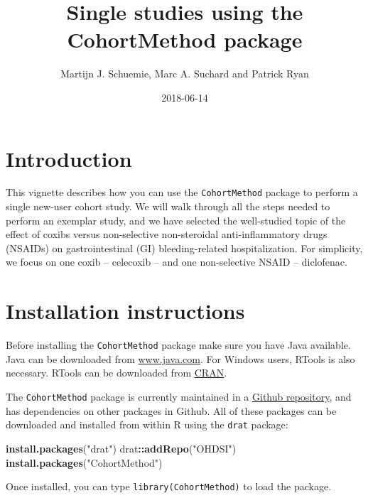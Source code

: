 \documentclass[]{article}
\title{Single studies using the CohortMethod package}
\author{Martijn J. Schuemie, Marc A. Suchard and Patrick Ryan}
\date{2018-06-14}
\newenvironment{Shaded}{\begin{snugshade}}{\end{snugshade}}
\newcommand{\KeywordTok}[1]{\textcolor[rgb]{0.13,0.29,0.53}{\textbf{#1}}}
\newcommand{\NormalTok}[1]{#1}
\newcommand{\OperatorTok}[1]{\textcolor[rgb]{0.81,0.36,0.00}{\textbf{#1}}}
\newcommand{\StringTok}[1]{\textcolor[rgb]{0.31,0.60,0.02}{#1}}
\begin{document}
\maketitle

{
\setcounter{tocdepth}{2}
\tableofcontents
}
\hypertarget{introduction}{%
\section{Introduction}\label{introduction}}

This vignette describes how you can use the \texttt{CohortMethod}
package to perform a single new-user cohort study. We will walk through
all the steps needed to perform an exemplar study, and we have selected
the well-studied topic of the effect of coxibs versus non-selective
non-steroidal anti-inflammatory drugs (NSAIDs) on gastrointestinal (GI)
bleeding-related hospitalization. For simplicity, we focus on one coxib
-- celecoxib -- and one non-selective NSAID -- diclofenac.

\hypertarget{installation-instructions}{%
\section{Installation instructions}\label{installation-instructions}}

Before installing the \texttt{CohortMethod} package make sure you have
Java available. Java can be downloaded from
\href{http://www.java.com}{www.java.com}. For Windows users, RTools is
also necessary. RTools can be downloaded from
\href{http://cran.r-project.org/bin/windows/Rtools/}{CRAN}.

The \texttt{CohortMethod} package is currently maintained in a
\href{https://github.com/OHDSI/CohortMethod}{Github repository}, and has
dependencies on other packages in Github. All of these packages can be
downloaded and installed from within R using the \texttt{drat} package:

\begin{Shaded}
\begin{Highlighting}[]
\KeywordTok{install.packages}\NormalTok{(}\StringTok{"drat"}\NormalTok{)}
\NormalTok{drat}\OperatorTok{::}\KeywordTok{addRepo}\NormalTok{(}\StringTok{"OHDSI"}\NormalTok{)}
\KeywordTok{install.packages}\NormalTok{(}\StringTok{"CohortMethod"}\NormalTok{)}
\end{Highlighting}
\end{Shaded}

Once installed, you can type \texttt{library(CohortMethod)} to load the
package.
\end{document}
